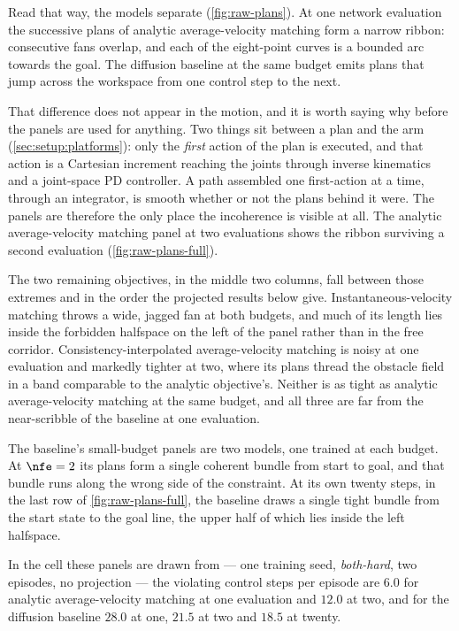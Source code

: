 Read that way, the models separate (\autoref{fig:raw-plans}). At one network evaluation the successive
plans of analytic average-velocity matching form a narrow ribbon: consecutive fans overlap, and each of
the eight-point curves is a bounded arc towards the goal. The diffusion baseline at the same budget emits
plans that jump across the workspace from one control step to the next.

That difference does not appear in the motion, and it is worth saying why before the panels are used for
anything. Two things sit between a plan and the arm (\autoref{sec:setup:platforms}): only the
\emph{first} action of the plan is executed, and that action is a Cartesian increment reaching the joints
through inverse kinematics and a joint-space PD controller. A path assembled one first-action at a time,
through an integrator, is smooth whether or not the plans behind it were. The panels are therefore the
only place the incoherence is visible at all. The analytic average-velocity matching panel at two
evaluations shows the ribbon surviving a second evaluation (\autoref{fig:raw-plans-full}).

The two remaining objectives, in the middle two columns, fall between those extremes and in the order
the projected results below give. Instantaneous-velocity matching throws a wide, jagged fan at both budgets, and much of its length
lies inside the forbidden halfspace on the left of the panel rather than in the free corridor.
Consistency-interpolated average-velocity matching is noisy at one evaluation and markedly tighter at two,
where its plans thread the obstacle field in a band comparable to the analytic objective's. Neither is as
tight as analytic average-velocity matching at the same budget, and all three are far from the near-scribble
of the baseline at one evaluation.

The baseline's small-budget panels are two models, one trained at each budget. At $\nfe=2$ its plans
form a single coherent bundle from start to goal, and that bundle runs along the wrong side of the
constraint. At its own twenty steps, in the last row of \autoref{fig:raw-plans-full}, the baseline draws a single tight bundle from the
start state to the goal line, the upper half of which lies inside the left halfspace.

In the cell these panels are drawn from --- one training seed, \emph{both-hard}, two episodes, no
projection --- the violating control steps per episode are $6.0$ for analytic average-velocity matching at one evaluation and $12.0$ at two, and for the
diffusion baseline $28.0$ at one, $21.5$ at two and $18.5$ at twenty.

